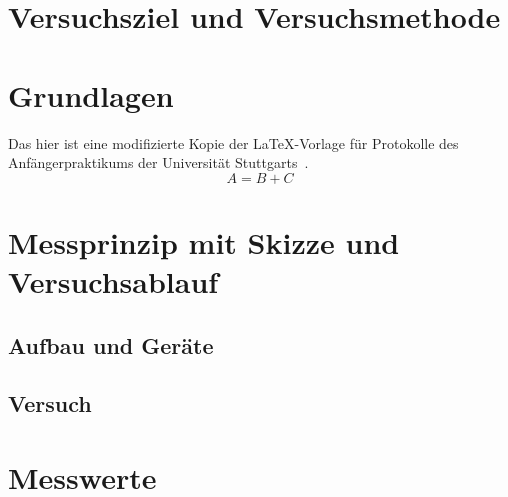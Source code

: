 \documentclass[
    a4paper, %
	ngerman, %
    12pt, %
	parskip=half, %
    oneside, %
	DIV=calc, %
]{scrartcl}
\begin{document}




\section[Versuchsziel]{Versuchsziel und Versuchsmethode}



\section[Grundlagen]{Grundlagen}
Das hier ist eine modifizierte Kopie der \LaTeX-Vorlage für Protokolle des Anfängerpraktikums der Universität Stuttgarts~\cite{homepage}. %
\begin{equation}
	A = B + C \label{eq:gleichung}
\end{equation}



\section[Messprinzip]{Messprinzip mit Skizze und Versuchsablauf}

\subsection{Aufbau und Geräte}
\subsection{Versuch} 



\section[Messwerte]{Messwerte}
\end{document}
